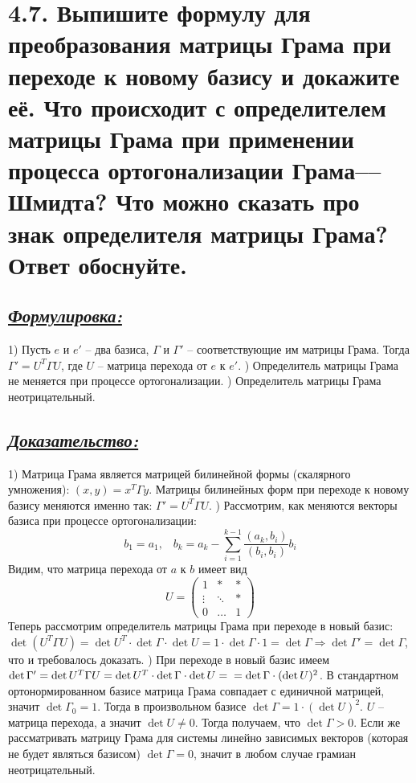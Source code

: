 \documentclass{article}
\begin{document}
\section*{\LARGE 4.7. Выпишите формулу для преобразования матрицы Грама при переходе к новому базису и докажите её. Что происходит с определителем матрицы Грама при применении процесса ортогонализации Грама––Шмидта? Что можно сказать про знак определителя матрицы Грама? Ответ обоснуйте.  }
\subsection*{\Large \underline{\textit{Формулировка: }}}
1) Пусть $e$ и $e'$ -- два базиса, $\Gamma$ и $\Gamma'$ -- соответствующие им матрицы Грама. Тогда $\Gamma' = U^T \Gamma U$, где $U$ -- матрица перехода от $e$ к $e'$.
) Определитель матрицы Грама не меняется при процессе ортогонализации. 
) Определитель матрицы Грама неотрицательный.

\subsection*{\Large \underline{\textit{Доказательство: }}}
1) Матрица Грама является матрицей билинейной формы (скалярного умножения): $(x, y) = x^T \Gamma y$. Матрицы билинейных форм при переходе к новому базису меняются именно так: $\Gamma' = U^T \Gamma U$.
) Рассмотрим, как меняются векторы базиса при процессе ортогонализации:
$$
b_1 = a_1, \;\;\; b_k = a_k - \sum_{i = 1}^{k-1} \frac{(a_k, b_i)}{(b_i, b_i)}b_i
$$
Видим, что матрица перехода от $a$ к $b$ имеет вид
$$
U = 
\begin{pmatrix}
1 & \ast & \ast \\
\vdots & \ddots & \ast \\
0 & \dots & 1
\end{pmatrix}
$$
Теперь рассмотрим определитель матрицы Грама при переходе в новый базис: $\det(U^T \Gamma U) = \det{U^T}\cdot \det{\Gamma} \cdot \det{U} = 1 \cdot \det{\Gamma} \cdot 1 = \det{\Gamma} \Rightarrow \det{\Gamma'} = \det{\Gamma}$, что и требовалось доказать.
) При переходе в новый базис имеем $\det{\Gamma'} = \det{U^T \Gamma U} = \det{U^T} \cdot \det{\Gamma} \cdot \det{U} = \newline = \det{\Gamma}\cdot(\det{U})^2$. В стандартном ортонормированном базисе матрица Грама совпадает с единичной матрицей, значит $\det{\Gamma_0} = 1$. Тогда в произвольном базисе $\det{\Gamma} = 1 \cdot (\det{U})^2$. $U$ -- матрица перехода, а значит $\det{U} \ne 0$. Тогда получаем, что $\det{\Gamma} > 0$. Если же рассматривать матрицу Грама для системы линейно зависимых векторов (которая не будет являться базисом) $\det{\Gamma} = 0$, значит в любом случае грамиан неотрицательный.
\end{document}

